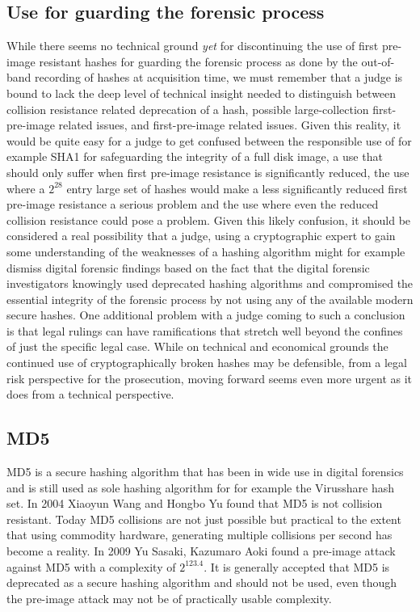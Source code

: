 \subsection{Use for guarding the forensic process}
While there seems no technical ground \emph{yet} for discontinuing the use of first pre-image resistant hashes for guarding the forensic process as done by the out-of-band recording of hashes at acquisition time, we must remember that a judge is bound to lack the deep level of technical insight needed to distinguish between collision resistance related deprecation of a hash, possible large-collection first-pre-image related issues, and first-pre-image related issues. Given this reality, it would be quite easy for a judge to get confused between the responsible use of for example SHA1 for safeguarding the integrity of a full disk image, a use that should only suffer when first pre-image resistance is significantly reduced, the use where a \(2^{28}\) entry large set of hashes would make a less significantly reduced first pre-image resistance a serious problem and the use where even the reduced collision resistance could pose a problem. Given this likely confusion, it should be considered a real possibility that a judge, using a cryptographic expert to gain some understanding of the weaknesses of a hashing algorithm might for example dismiss digital forensic findings based on the fact that the digital forensic investigators knowingly used deprecated hashing algorithms and compromised the essential integrity of the forensic process by not using any of the available modern secure hashes. One additional problem with a judge coming to such a conclusion is that legal rulings can have ramifications that stretch well beyond the confines of just the specific legal case. While on technical and economical grounds the continued use of cryptographically broken hashes may be defensible, from a legal risk perspective for the prosecution, moving forward seems even more urgent as it does from a technical perspective. 
\subsection{MD5}
MD5 is a secure hashing algorithm that has been in wide use in digital forensics and is still used as sole hashing algorithm for for example the Virusshare hash set. In 2004 Xiaoyun Wang and Hongbo Yu found that MD5 is not collision resistant. Today MD5 collisions are not just possible but practical to the extent that using commodity hardware, generating multiple collisions per second has become a reality. In 2009 Yu Sasaki, Kazumaro Aoki found a pre-image attack against MD5 with a complexity of \(2^{123.4}\). It is generally accepted that MD5 is deprecated as a secure hashing algorithm and should not be used, even though the pre-image attack may not be of practically usable complexity.
